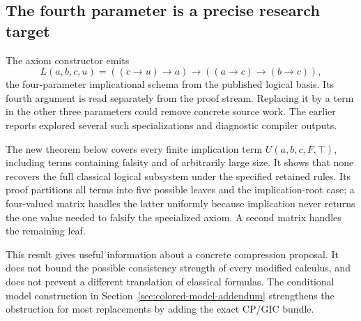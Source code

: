\subsection{The fourth parameter is a precise research target}

The axiom constructor emits
\[
 L(a,b,c,u)=((c\to u)\to a)\to((a\to c)\to(b\to c)),
\]
the four-parameter implicational schema from the published logical
basis. Its fourth argument is read separately from the proof stream.
Replacing it by a term in the other three parameters could remove
concrete source work. The earlier reports explored several such
specializations and diagnostic compiler outputs.\cite{companion239,upstream-logic}

The new theorem below covers every finite implication term
$U(a,b,c,F,\top)$, including terms containing falsity and of arbitrarily
large size. It shows that none recovers the full classical logical
subsystem under the specified retained rules. Its proof partitions all
terms into five possible leaves and the implication-root case; a
four-valued matrix handles the latter uniformly because implication
never returns the one value needed to falsify the specialized axiom.
A second matrix handles the remaining leaf.

This result gives useful information about a concrete compression
proposal. It does not bound the possible consistency strength of every
modified calculus, and does not prevent a different translation of
classical formulas. The conditional model construction in
Section~\ref{sec:colored-model-addendum} strengthens the obstruction for most replacements by
adding the exact CP/GIC bundle.
